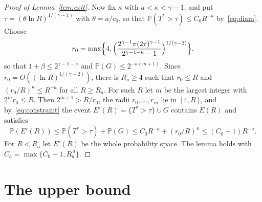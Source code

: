\documentclass[11pt]{amsart}
\theoremstyle{remark}
\newcommand{\Prob}{\mathbb{P}}
\begin{document}
\begin{proof}[Proof of Lemma~\ref{lem:exit}]
Now fix $\kappa$ with $a<\kappa<\gamma-1$, and put $\tau=(\theta\ln R)^{1/(\gamma-1)}$ with $\theta=a/c_0$, so that
$\Prob(T^*>\tau)\le C_0R^{-a}$ by~\eqref{eq:diam}. Choose
\[
r_0=\max\Bigl\{4,\Bigl(\frac{2^{\gamma-1}\pi(2\tau)^{\gamma-1}}{2^{\gamma-1-\kappa}-1}\Bigr)^{1/(\gamma-2)}\Bigr\},
\]
so that $1+\beta\le2^{\gamma-1-\kappa}$ and $\Prob(G)\le2^{-\kappa(m+1)}$. Since $r_0=O((\ln R)^{1/(\gamma-2)})$, there
is $R_a\ge4$ such that $r_0\le R$ and $(r_0/R)^\kappa\le R^{-a}$ for all $R\ge R_a$. For such $R$ let $m$ be the
largest integer with $2^mr_0\le R$. Then $2^{m+1}>R/r_0$, the radii $r_0,\dots,r_m$ lie in $[4,R]$, and
by~\eqref{eq:constraint} the event $E'(R)=\{T^*>\tau\}\cup G$ contains $E(R)$ and satisfies
\[
\Prob(E'(R))\le\Prob(T^*>\tau)+\Prob(G)\le C_0R^{-a}+(r_0/R)^{\kappa}\le(C_0+1)R^{-a}.
\]
For $R<R_a$ let $E'(R)$ be the whole probability space. The lemma holds with $C_a=\max\{C_0+1,R_a^{\,a}\}$.
\end{proof}

\section{The upper bound}\label{sec:upper}
\end{document}
